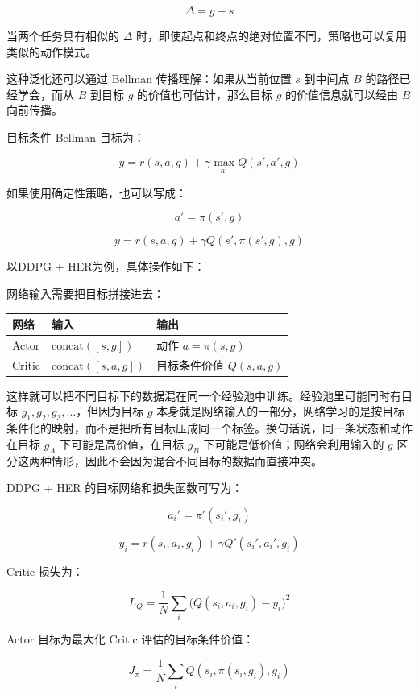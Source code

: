 \[
\Delta=g-s
\]

当两个任务具有相似的 \(\Delta\) 时，即使起点和终点的绝对位置不同，策略也可以复用类似的动作模式。

这种泛化还可以通过 Bellman 传播理解：如果从当前位置 \(s\) 到中间点 \(B\) 的路径已经学会，而从 \(B\) 到目标 \(g\) 的价值也可估计，那么目标 \(g\) 的价值信息就可以经由 \(B\) 向前传播。

目标条件 Bellman 目标为：

\[
y
=
r(s,a,g)
+
\gamma
\max_{a'}Q(s',a',g)
\]

如果使用确定性策略，也可以写成：

\[
a'=\pi(s',g)
\]

\[
y
=
r(s,a,g)
+
\gamma Q(s',\pi(s',g),g)
\]

以DDPG + HER为例，具体操作如下：

网络输入需要把目标拼接进去：

\begin{longtable}[]{@{}
  >{\raggedright\arraybackslash}p{}
  >{\raggedright\arraybackslash}p{}
  >{\raggedright\arraybackslash}p{}@{}}
\toprule
网络 & 输入 & 输出 \\
\midrule
\endhead
Actor & \(\mathrm{concat}([s,g])\) & 动作 \(a=\pi(s,g)\) \\
Critic & \(\mathrm{concat}([s,a,g])\) & 目标条件价值 \(Q(s,a,g)\) \\
\bottomrule
\end{longtable}

这样就可以把不同目标下的数据混在同一个经验池中训练。经验池里可能同时有目标 \(g_1,g_2,g_3,\ldots\)，但因为目标 \(g\) 本身就是网络输入的一部分，网络学习的是按目标条件化的映射，而不是把所有目标压成同一个标签。换句话说，同一条状态和动作在目标 \(g_A\) 下可能是高价值，在目标 \(g_B\) 下可能是低价值；网络会利用输入的 \(g\) 区分这两种情形，因此不会因为混合不同目标的数据而直接冲突。

DDPG + HER 的目标网络和损失函数可写为：

\[
a_i'=\pi'(s_i',g_i)
\]

\[
y_i
=
r(s_i,a_i,g_i)
+
\gamma Q'(s_i',a_i',g_i)
\]

Critic 损失为：

\[
L_Q
=
\frac{1}{N}
\sum_i
\bigl(
Q(s_i,a_i,g_i)-y_i
\bigr)^{2}
\]

Actor 目标为最大化 Critic 评估的目标条件价值：

\[
J_\pi
=
\frac{1}{N}
\sum_i
Q(s_i,\pi(s_i,g_i),g_i)
\]

